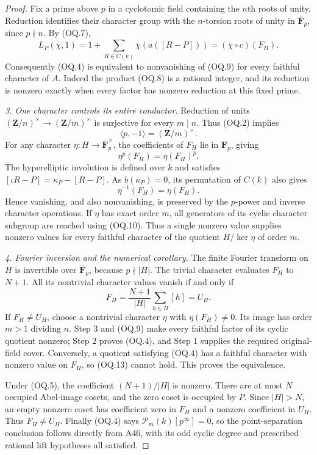 \documentclass[11pt,a4paper]{article}
\begin{document}
\begin{proof}
Fix a prime above $p$ in a cyclotomic field containing the $n$th
roots of unity. Reduction identifies their character group with
the $n$-torsion roots of unity in $\overline{\mathbf F}_p$, since
$p\nmid n$. By (OQ.7),
\[
        \overline{L_P(\chi,1)}
          =1+\sum_{R\in C(k)}\bar\chi(a([R-P]))
          =(\bar\chi\circ c)(F_H).
 \tag{OQ.9}
\]
Consequently (OQ.4) is equivalent to nonvanishing of (OQ.9)
for every faithful character of $A$. Indeed the product (OQ.8)
is a rational integer, and its reduction is nonzero exactly
when every factor has nonzero reduction at this fixed prime.

\emph{3. One character controls its entire conductor.}
Reduction of units $(\mathbf Z/n)^\times\to(\mathbf Z/m)^\times$
is surjective for every $m\mid n$. Thus (OQ.2) implies
\[
             \langle p,-1\rangle=(\mathbf Z/m)^\times.
 \tag{OQ.10}
\]
For any character $\eta:H\to\overline{\mathbf F}_p^\times$,
the coefficients of $F_H$ lie in $\mathbf F_p$, giving
\[
                 \eta^p(F_H)=\eta(F_H)^p.
 \tag{OQ.11}
\]
The hyperelliptic involution is defined over $k$ and satisfies
$[\iota R-P]=\kappa_P-[R-P]$.
As $b(\kappa_P)=0$, its permutation of $C(k)$ also gives
\[
                         \eta^{-1}(F_H)=\eta(F_H).
 \tag{OQ.12}
\]
Hence vanishing, and also nonvanishing, is preserved by the
$p$-power and inverse character operations. If $\eta$ has
exact order $m$, all generators of its cyclic character subgroup
are reached using (OQ.10). Thus a single nonzero value supplies
nonzero values for every faithful character of the quotient
$H/\ker\eta$ of order $m$.

\emph{4. Fourier inversion and the numerical corollary.}
The finite Fourier transform on $H$ is invertible over
$\overline{\mathbf F}_p$, because $p\nmid|H|$.
The trivial character evaluates $F_H$ to $N+1$.
All its nontrivial character values vanish if and only if
\[
                   F_H=\frac{N+1}{|H|}\sum_{h\in H}[h]=U_H.
 \tag{OQ.13}
\]
If $F_H\ne U_H$, choose a nontrivial character $\eta$ with
$\eta(F_H)\ne0$. Its image has order $m>1$ dividing $n$.
Step 3 and (OQ.9) make every faithful factor of its cyclic
quotient nonzero; Step 2 proves (OQ.4), and Step 1 supplies
the required original-field cover. Conversely, a quotient
satisfying (OQ.4) has a faithful character with nonzero value
on $F_H$, so (OQ.13) cannot hold. This proves the equivalence.

Under (OQ.5), the coefficient $(N+1)/|H|$ is nonzero.
There are at most $N$ occupied Abel-image cosets, and the zero
coset is occupied by $P$. Since $|H|>N$, an empty nonzero coset
has coefficient zero in $F_H$ and a nonzero coefficient in
$U_H$. Thus $F_H\ne U_H$. Finally (OQ.4) says
$\mathcal P_m(k)[p^\infty]=0$, so the point-separation
conclusion follows directly from A46, with its odd cyclic
degree and prescribed rational lift hypotheses all satisfied.
\end{proof}
\end{document}
